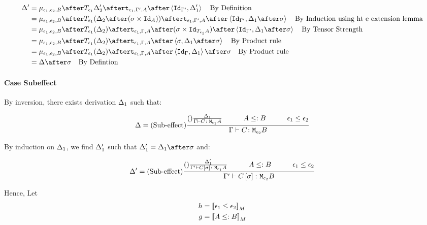 {    \begin{align}
        \D' & = \bind{\e_1}{\e_2}{B}\after\T{\e_1}{\D_2'}\after\tstrength{\e_1}{\G'}{A}\after\pr{\Id{\G'}}{\D_1'}\qt{By Definition}\\
        & = \bind{\e_1}{\e_2}{B}\after\T{\e_1}{(\D_2\after(\si\times\Id{A}))}\after\tstrength{\e_1}{\G'}{A}\after\pr{\Id{\G'}}{\D_1\after\si}\qt{By Induction using ht e extension lemma}\\
        & = \bind{\e_1}{\e_2}{B}\after\T{\e_1}{(\D_2)}\after\tstrength{\e_1}{\G}{A}\after(\si\times\Id{\T{\e_1}{A}})\after\pr{\Id{\G'}}{\D_1\after\si}\qt{By Tensor Strength}\\
        & = \bind{\e_1}{\e_2}{B}\after\T{\e_1}{(\D_2)}\after\tstrength{\e_1}{\G}{A}\after\pr{\si}{\D_1\after\si}\qt{By Product rule}\\
        & = \bind{\e_1}{\e_2}{B}\after\T{\e_1}{(\D_2)}\after\tstrength{\e_1}{\G}{A}\after\pr{\idg}{\D_1}\after\si\qt{By Product rule}\\
        &= \D\after\si\qt{By Defintion}\\
    \end{align}


    \paragraph{Case Subeffect}

    By inversion, there exists derivation $\Delta_1$ such that:

    \begin{equation}
        \D = \treerule{Sub-effect}{\treerule{}{\D_1}{\typerelation{\G}{C}{\M{\e_1}{A}}}\s\s A\subtype B\s\s \e_1\subeffect\e_2}{\typerelation{\G}{C}{\M{\e_2}{B}}}
    \end{equation}

    By induction on $\Delta_1$, we find $\Delta_1'$ such that $\D_1' = \D_1\after\si$ and:

    \begin{equation}
        \D' = \treerule{Sub-effect}{\treerule{}{\D_1'}{\typerelation{\G'}{C\ssi}{\M{\e_1}{A}}}\s\s A\subtype B\s\s \e_1\subeffect\e_2}{\typerelation{\G'}{C\ssi}{\M{\e_2}{B}}}
    \end{equation}

    Hence,
    Let
    \begin{align}
        h &= {\bf [\![}\epsilon_1\leq\epsilon_2{\bf ]\!]}_M\\
        g &= {\bf [\![}A\leq: B{\bf ]\!]}_M
    \end{align}

}
